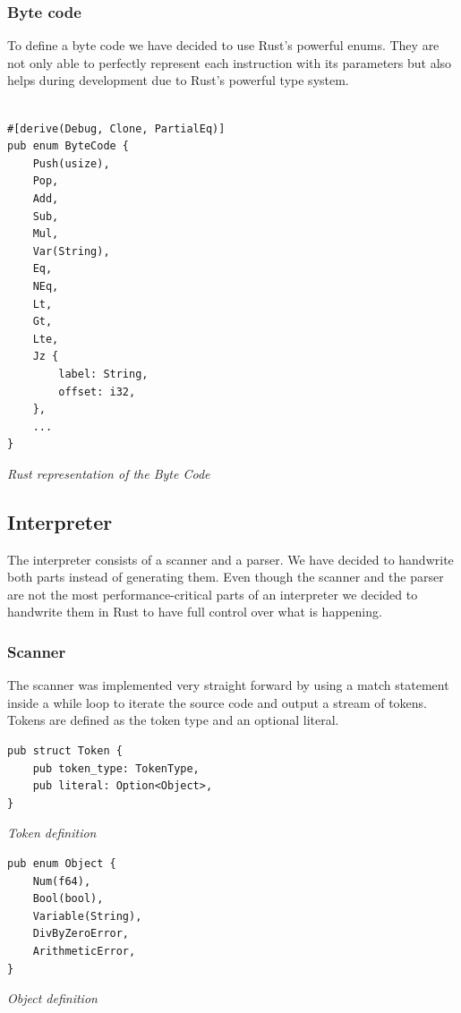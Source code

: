 \documentclass{article}
\begin{document}
\subsubsection{Byte code}
\label{sec:byte_code}

To define a byte code we have decided to use Rust's powerful enums. They are
not only able to perfectly represent each instruction with its parameters but
also helps during development due to Rust's powerful type system.

\begin{verbatim}

#[derive(Debug, Clone, PartialEq)]
pub enum ByteCode {
    Push(usize),
    Pop,
    Add,
    Sub,
    Mul,
    Var(String),
    Eq,
    NEq,
    Lt,
    Gt,
    Lte,
    Jz {
        label: String,
        offset: i32,
    },
    ...
}

\end{verbatim}
\textit{Rust representation of the Byte Code} \\

\subsection{Interpreter}
The interpreter consists of a scanner and a parser. We have decided to
handwrite both parts instead of generating them. Even though the scanner and
the parser are not the most performance-critical parts of an interpreter we
decided to handwrite them in Rust to have full control over what is happening.

\subsubsection{Scanner}
The scanner was implemented very straight forward by using a match statement
inside a while loop to iterate the source code and output a stream of tokens.
Tokens are defined as the token type and an optional literal.

\begin{verbatim}
pub struct Token {
    pub token_type: TokenType,
    pub literal: Option<Object>,
}
\end{verbatim}
\textit{Token definition}

\begin{verbatim}
pub enum Object {
    Num(f64),
    Bool(bool),
    Variable(String),
    DivByZeroError,
    ArithmeticError,
}
\end{verbatim}
\textit{Object definition}
\end{document}
